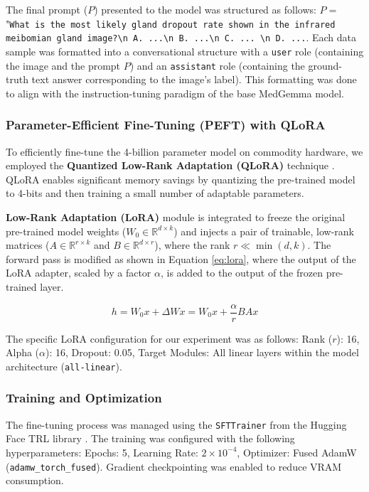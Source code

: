 \documentclass{article}
\begin{document}
The final prompt ($P$) presented to the model was structured as follows: $P = $ "\texttt{What is the most likely gland dropout rate shown in the infrared meibomian gland image?\textbackslash n A. ...\textbackslash n B. ...\textbackslash n C. ... \textbackslash n D. ...}. Each data sample was formatted into a conversational structure with a \texttt{user} role (containing the image and the prompt $P$) and an \texttt{assistant} role (containing the ground-truth text answer corresponding to the image's label). This formatting was done to align with the instruction-tuning paradigm of the base MedGemma model.

\subsubsection{Parameter-Efficient Fine-Tuning (PEFT) with QLoRA}
To efficiently fine-tune the 4-billion parameter model on commodity hardware, we employed the \textbf{Quantized Low-Rank Adaptation (QLoRA)} technique \cite{hu2021loralowrankadaptationlarge} \cite{dettmers2023qlora}. QLoRA enables significant memory savings by quantizing the pre-trained model to 4-bits and then training a small number of adaptable parameters.

\textbf{Low-Rank Adaptation (LoRA)} module is integrated to freeze the original pre-trained model weights ($W_0 \in \mathbb{R}^{d \times k}$) and injects a pair of trainable, low-rank matrices ($A \in \mathbb{R}^{r \times k}$ and $B \in \mathbb{R}^{d \times r}$), where the rank $r \ll \min(d, k)$. The forward pass is modified as shown in Equation \ref{eq:lora}, where the output of the LoRA adapter, scaled by a factor $\alpha$, is added to the output of the frozen pre-trained layer.

\begin{equation}
\label{eq:lora}
h = W_0x + \Delta Wx = W_0x + \frac{\alpha}{r}BAx
\end{equation}

The specific LoRA configuration for our experiment was as follows:
Rank ($r$): 16, Alpha ($\alpha$): 16, Dropout: 0.05, Target Modules: All linear layers within the model architecture (\texttt{all-linear}). 

\subsubsection{Training and Optimization}
The fine-tuning process was managed using the \texttt{SFTTrainer} from the Hugging Face TRL library \cite{trl}. The training was configured with the following hyperparameters: Epochs: 5, Learning Rate: $2 \times 10^{-4}$, Optimizer: Fused AdamW (\texttt{adamw\_torch\_fused}). Gradient checkpointing was enabled to reduce VRAM consumption.
\end{document}
